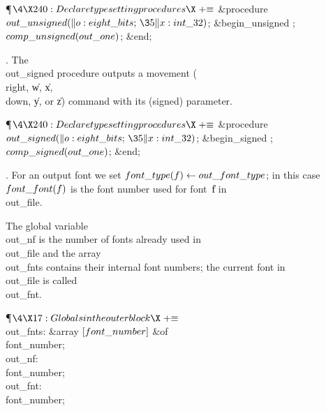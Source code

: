 \Y\P$\4\X240:Declare typesetting procedures\X\mathrel{+}\S$\6
\4\&{procedure}\1\  $\\{out\_unsigned}(\|o:\\{eight\_bits};\,\35\|x:\\{int%
\_32})$;\2\6
\&{begin\_unsigned} ;\5
$\\{comp\_unsigned}(\\{out\_one})$;\6
\&{end};\par
\fi

. The \\{out\_signed} procedure outputs a movement (\\{right}, \|w,
\|x, \\{down}, \|y, or \|z) command with its (signed) parameter.

\Y\P$\4\X240:Declare typesetting procedures\X\mathrel{+}\S$\6
\4\&{procedure}\1\  $\\{out\_signed}(\|o:\\{eight\_bits};\,\35\|x:\\{int%
\_32})$;\2\6
\&{begin\_signed} ;\5
$\\{comp\_signed}(\\{out\_one})$;\6
\&{end};\par
\fi

. For an output font we set $\\{font\_type}(\|f)\K\\{out\_font\_type}$; in
this case
$\\{font\_font}(\|f)$ is the font number used for font~\|f in \\{out\_file}.

The global variable \\{out\_nf} is the number of fonts already used in
\\{out\_file} and the array \\{out\_fnts} contains their internal font numbers;
the current font in \\{out\_file} is called \\{out\_fnt}.

\Y\P$\4\X17:Globals in the outer block\X\mathrel{+}\S$\6
\4\\{out\_fnts}: \&{array} $[\\{font\_number}]$ \1\&{of}\5
\\{font\_number};\2\6
\4\\{out\_nf}: \\{font\_number};\6
\4\\{out\_fnt}: \\{font\_number};\par
\fi

